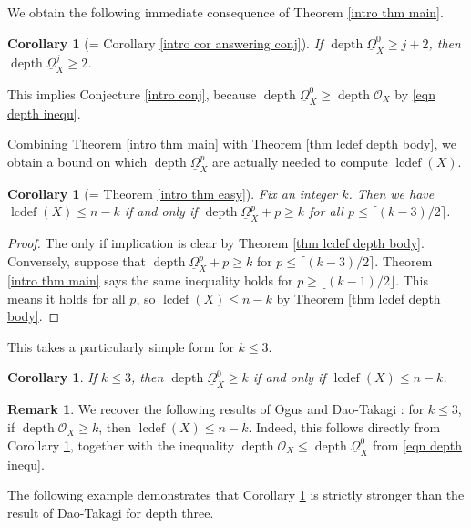 \documentclass[11pt]{amsart}
\newtheorem{corollary}[equation]{Corollary}
\theoremstyle{definition}
\newtheorem{remark}[equation]{Remark}
\theoremstyle{plain}
\newcounter{intro}
\DeclareMathOperator{\lcdef}{lcdef}
\DeclareMathOperator{\depth}{depth}
\begin{document}
We obtain the following immediate consequence of Theorem \ref{intro thm main}.

\begin{corollary}[= Corollary \ref{intro cor answering conj}]
If $\depth \underline{\Omega}_X^0 \geq j+2$, then $\depth \underline{\Omega}_X^j \geq 2$.
\end{corollary}

This implies Conjecture \ref{intro conj}, because $\depth \underline{\Omega}_X^0 \geq \depth \mathscr{O}_X$ by \ref{eqn depth inequ}.


Combining Theorem \ref{intro thm main} with Theorem \ref{thm lcdef depth body}, we obtain a bound on which $\depth \underline{\Omega}_X^p$ are actually needed to compute $\lcdef(X)$. 

\begin{corollary}[= Theorem \ref{intro thm easy}]\label{cor easy}
Fix an integer $k$. Then we have $\lcdef (X) \leq n-k$ if and only if 
$\depth \underline{\Omega}_X^p + p \geq k$ for all $p \leq \lceil (k-3)/2 \rceil$.
\end{corollary}

\begin{proof}
The only if implication is clear by Theorem \ref{thm lcdef depth body}. Conversely, suppose that $\depth \underline{\Omega}_X^p + p \geq k$ for $p \leq \lceil (k-3)/2 \rceil$. Theorem \ref{intro thm main} says the same inequality holds for $p \geq \lfloor (k-1)/2 \rfloor$. This means it holds for all $p$, so $\lcdef(X) \leq n-k$ by Theorem \ref{thm lcdef depth body}.
\end{proof}

This takes a particularly simple form for $k \leq 3$.

\begin{corollary}\label{cor dao takagi}
If $k \leq 3$, then $\depth \underline{\Omega}_X^0 \geq k$ if and only if $\lcdef(X) \leq n-k$.
\end{corollary}

\begin{remark}\label{rmk injectivity thm}
We recover the following results of Ogus \cite{ogus} and Dao-Takagi \cite{dao takagi}: for $k \leq 3$, if $\depth \mathscr{O}_X \geq k$, then $\lcdef(X) \leq n - k$. Indeed, this follows directly from Corollary \ref{cor dao takagi}, together with the inequality $\depth \mathscr{O}_X \leq \depth \underline{\Omega}_X^0$ from \ref{eqn depth inequ}.
\end{remark}

The following example demonstrates that Corollary \ref{cor dao takagi} is strictly stronger than the result of Dao-Takagi for depth three.
\end{document}
